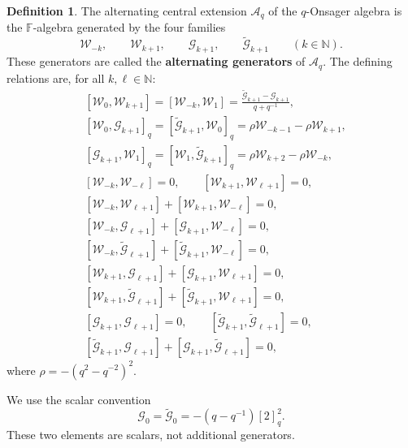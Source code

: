 \documentclass[11pt]{extarticle}
\theoremstyle{definition}
\newtheorem{definition}[theorem]{Definition}
\theoremstyle{remark}
\numberwithin{equation}{section}
\newcommand{\F}{\mathbb F}
\newcommand{\N}{\mathbb N}
\newcommand{\Aq}{\mathcal A_q}
\newcommand{\cW}{\mathcal W}
\newcommand{\cG}{\mathcal G}
\newcommand{\ctG}{\widetilde{\mathcal G}}
\newcommand{\Gt}{\widetilde{\cG}}
\begin{document}
\begin{definition}\label{def:Aq}
The alternating central extension $\Aq$ of the $q$-Onsager algebra is the
$\F$-algebra generated by the four families
\[
        \cW_{-k},\qquad \cW_{k+1},\qquad
        \cG_{k+1},\qquad \Gt_{k+1}
        \qquad (k\in\N).
\]
These generators are called the \textbf{alternating generators} of $\Aq$.
The defining relations are, for all $k,\ell\in\N$:
\begin{align}
&[\cW_0,\cW_{k+1}]
        =[\cW_{-k},\cW_1]
          =\frac{\Gt_{k+1}-\cG_{k+1}}{q+q^{-1}},
          \label{eq:Aq1}\\
&[\cW_0,\cG_{k+1}]_q
        =[\Gt_{k+1},\cW_0]_q
          =\rho \cW_{-k-1}-\rho \cW_{k+1},
          \label{eq:Aq2}\\
&[\cG_{k+1},\cW_1]_q
        =[\cW_1,\Gt_{k+1}]_q
          =\rho \cW_{k+2}-\rho \cW_{-k},
          \label{eq:Aq3}\\
&[\cW_{-k},\cW_{-\ell}]=0,
        \qquad
        [\cW_{k+1},\cW_{\ell+1}]=0,
        \label{eq:Aq4}\\
&[\cW_{-k},\cW_{\ell+1}]
        +[\cW_{k+1},\cW_{-\ell}]=0,
        \label{eq:Aq5}\\
&[\cW_{-k},\cG_{\ell+1}]
        +[\cG_{k+1},\cW_{-\ell}]=0,
        \label{eq:Aq6}\\
&[\cW_{-k},\Gt_{\ell+1}]
        +[\Gt_{k+1},\cW_{-\ell}]=0,
        \label{eq:Aq7}\\
&[\cW_{k+1},\cG_{\ell+1}]
        +[\cG_{k+1},\cW_{\ell+1}]=0,
        \label{eq:Aq8}\\
&[\cW_{k+1},\Gt_{\ell+1}]
        +[\Gt_{k+1},\cW_{\ell+1}]=0,
        \label{eq:Aq9}\\
&[\cG_{k+1},\cG_{\ell+1}]=0,
        \qquad
        [\Gt_{k+1},\Gt_{\ell+1}]=0,
        \label{eq:Aq10}\\
&[\Gt_{k+1},\cG_{\ell+1}]
        +[\cG_{k+1},\Gt_{\ell+1}]=0,
        \label{eq:Aq11}
\end{align}
where $\rho=-(q^2-q^{-2})^2$.
\end{definition}

We use the scalar convention
\begin{equation}
\label{eq:Aq-G0}
        \cG_0=\ctG_0=-(q-q^{-1})[2]_q^2 .
\end{equation}
These two elements are scalars, not additional generators.
\end{document}
